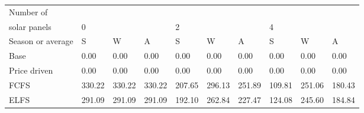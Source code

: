\begin{table}[h] 
\centering 
\begin{tabular}{l|lll|lll|lll}Number of \\ solar panels&0& & &2& & &4& & \\ \hline 
Season or average & S & W & A & S & W & A & S & W & A \\ \hline 
Base&0.00&0.00&0.00&0.00&0.00&0.00&0.00&0.00&0.00 \\ 
Price driven&0.00&0.00&0.00&0.00&0.00&0.00&0.00&0.00&0.00 \\ 
FCFS&330.22&330.22&330.22&207.65&296.13&251.89&109.81&251.06&180.43 \\ 
ELFS&291.09&291.09&291.09&192.10&262.84&227.47&124.08&245.60&184.84 \\ 
\end{tabular} 
\end{table}